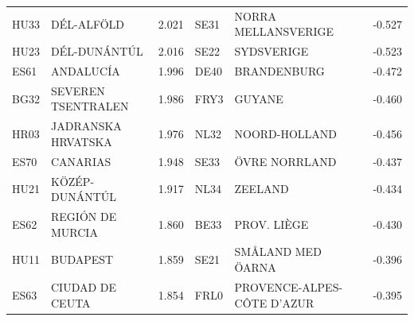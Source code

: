 \documentclass[a4paper,11pt,oneside]{article}
\begin{document}
\begin{table}
\begin{tabular}{llllll}
HU33 & DÉL-ALFÖLD                          & 2.021 & SE31 & NORRA MELLANSVERIGE                                         & -0.527 \\
HU23 & DÉL-DUNÁNTÚL                        & 2.016 & SE22 & SYDSVERIGE                                                  & -0.523 \\
ES61 & ANDALUCÍA                           & 1.996 & DE40 & BRANDENBURG                                                 & -0.472 \\
BG32 & SEVEREN TSENTRALEN                  & 1.986 & FRY3 & GUYANE                                                      & -0.460 \\
HR03 & JADRANSKA HRVATSKA                  & 1.976 & NL32 & NOORD-HOLLAND                                               & -0.456 \\
ES70 & CANARIAS                            & 1.948 & SE33 & ÖVRE NORRLAND                                               & -0.437 \\
HU21 & KÖZÉP-DUNÁNTÚL                      & 1.917 & NL34 & ZEELAND                                                     & -0.434 \\
ES62 & REGIÓN DE MURCIA                    & 1.860 & BE33 & PROV. LIÈGE                                                 & -0.430 \\
HU11 & BUDAPEST                            & 1.859 & SE21 & SMÅLAND MED ÖARNA                                           & -0.396 \\
ES63 & CIUDAD DE CEUTA                     & 1.854 & FRL0 & PROVENCE-ALPES-CÔTE D’AZUR                                  & -0.395 \\
\bottomrule
\end{tabular}
\end{table}






\pagebreak
\clearpage



\end{document}
